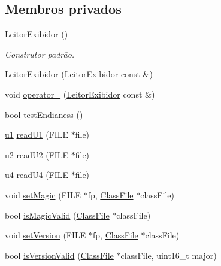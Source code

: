 \subsection*{Membros privados}
\begin{DoxyCompactItemize}
\item 
\hyperlink{classLeitorExibidor_a246be764c0b6895539f915cc0f813e7b}{Leitor\+Exibidor} ()
\begin{DoxyCompactList}\small\item\em Construtor padrão. \end{DoxyCompactList}\item 
\hyperlink{classLeitorExibidor_a98a0f84f7d42d7868317cacfc883398d}{Leitor\+Exibidor} (\hyperlink{classLeitorExibidor}{Leitor\+Exibidor} const \&)
\item 
void \hyperlink{classLeitorExibidor_ad273b8b4b3210bf1c246b1226bdaf1c8}{operator=} (\hyperlink{classLeitorExibidor}{Leitor\+Exibidor} const \&)
\item 
bool \hyperlink{classLeitorExibidor_ac8ff6248b6897d88bb5cf22ea987a6ab}{test\+Endianess} ()
\item 
\hyperlink{BasicTypes_8h_ad9f4cdb6757615aae2fad89dab3c5470}{u1} \hyperlink{classLeitorExibidor_af679ae83326347418cd0d3c90776d7a3}{read\+U1} (F\+I\+LE $\ast$file)
\item 
\hyperlink{BasicTypes_8h_a732cde1300aafb73b0ea6c2558a7a54f}{u2} \hyperlink{classLeitorExibidor_aa801d28856915543cfd59fb787e59626}{read\+U2} (F\+I\+LE $\ast$file)
\item 
\hyperlink{BasicTypes_8h_ae5be1f726785414dd1b77d60df074c9d}{u4} \hyperlink{classLeitorExibidor_a5ce4bdf25870ab04449d4ba35a961390}{read\+U4} (F\+I\+LE $\ast$file)
\item 
void \hyperlink{classLeitorExibidor_a08d4a6ea1c0f054f6f2969afe96a1d99}{set\+Magic} (F\+I\+LE $\ast$fp, \hyperlink{classClassFile}{Class\+File} $\ast$class\+File)
\item 
bool \hyperlink{classLeitorExibidor_ad6afc52067f5e3542024c7b494ce3ae3}{is\+Magic\+Valid} (\hyperlink{classClassFile}{Class\+File} $\ast$class\+File)
\item 
void \hyperlink{classLeitorExibidor_a9a11956018816200897ca137c027cbf1}{set\+Version} (F\+I\+LE $\ast$fp, \hyperlink{classClassFile}{Class\+File} $\ast$class\+File)
\item 
bool \hyperlink{classLeitorExibidor_a11629e5b6b841cefaa2f8544ef2b9ab1}{is\+Version\+Valid} (\hyperlink{classClassFile}{Class\+File} $\ast$class\+File, uint16\+\_\+t major)
\item 

\end{DoxyCompactItemize}
